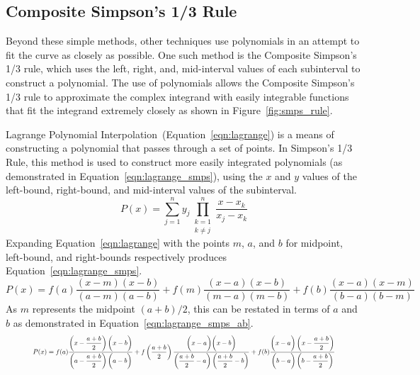 \documentclass{paper}
\begin{document}
\subsection{Composite Simpson's 1/3 Rule}
Beyond these simple methods, other techniques use polynomials in an attempt to fit the curve as closely as possible.
One such method is the Composite Simpson's 1/3 rule, which uses the left, right, and, mid-interval values of each subinterval to construct a polynomial.
The use of polynomials allows the Composite Simpson's 1/3 rule to approximate the complex integrand with easily integrable functions that fit the integrand extremely closely as shown in Figure~\ref{fig:smps_rule}.
%

%
Lagrange Polynomial Interpolation~(Equation~\ref{eqn:lagrange}) is a means of constructing a polynomial that passes through a set of points.
In Simpson's 1/3 Rule, this method is used to construct more easily integrated polynomials (as demonstrated in Equation~\ref{eqn:lagrange_smps}), using the \(x\) and \(y\) values of the left-bound, right-bound, and mid-interval values of the subinterval.
%
\begin{equation}
    \label{eqn:lagrange}
    P(x) = \sum_{j=1}^n y_j \prod_{\substack{k = 1 \\ k \neq j}}^n \dfrac{x - x_k}{x_j - x_k}
\end{equation}
%
Expanding Equation~\ref{eqn:lagrange} with the points \(m\), \(a\), and \(b\) for midpoint, left-bound, and right-bounds respectively produces Equation~\ref{eqn:lagrange_smps}.
%
\begin{equation}
    \label{eqn:lagrange_smps}
    P(x) = f(a) \dfrac{(x - m)(x - b)}{(a - m)(a - b)} + f(m) \dfrac{(x - a)(x - b)}{(m - a)(m - b)} + f(b) \dfrac{(x - a)(x - m)}{(b - a)(b - m)}
\end{equation}
%
As \(m\) represents the midpoint \((a + b) / 2\), this can be restated in terms of \(a\) and \(b\) as demonstrated in Equation~\ref{eqn:lagrange_smps_ab}.
%
\begin{equation}
    \label{eqn:lagrange_smps_ab}
    \resizebox{.9\textwidth}{!} 
    {
    $P(x) = f(a) \dfrac{\left(x - \dfrac{a+b}{2}\right)\biggl(x - b\biggr)}{\left(a - \dfrac{a+b}{2}\right)\biggl(a - b\biggr)} + f\left(\dfrac{a+b}{2}\right) \dfrac{\biggl(x - a\biggr)\biggl(x - b\biggr)}{\left(\dfrac{a+b}{2} - a\right)\left(\dfrac{a+b}{2} - b\right)} + f(b) \dfrac{\biggl(x - a\biggr)\left(x - \dfrac{a+b}{2}\right)}{\biggl(b - a\biggr)\left(b - \dfrac{a+b}{2}\right)}$
    }
\end{equation}
\end{document}
